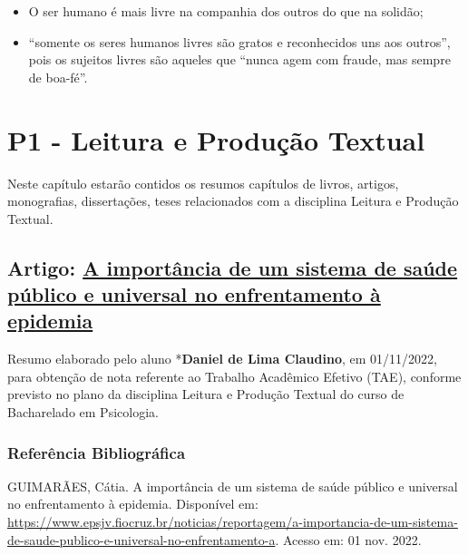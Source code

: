 \documentclass[
]{book}
\providecommand{\tightlist}{%
  \setlength{\itemsep}{0pt}\setlength{\parskip}{0pt}}
\begin{document}
\begin{itemize}
  \begin{itemize}
  \tightlist
  \item
    O ser humano é mais livre na companhia dos outros do que na solidão;
  \item
    ``somente os seres humanos livres são gratos e reconhecidos uns aos outros'', pois os sujeitos livres são aqueles que ``nunca agem com fraude, mas sempre de boa-fé''.
  \end{itemize}
\end{itemize}

\hypertarget{p1---leitura-e-produuxe7uxe3o-textual}{%
\chapter{P1 - Leitura e Produção Textual}\label{p1---leitura-e-produuxe7uxe3o-textual}}

Neste capítulo estarão contidos os resumos capítulos de livros, artigos, monografias, dissertações, teses relacionados com a disciplina Leitura e Produção Textual.

\hypertarget{artigo-a-importuxe2ncia-de-um-sistema-de-sauxfade-puxfablico-e-universal-no-enfrentamento-uxe0-epidemia}{%
\section{\texorpdfstring{Artigo: \href{https://www.epsjv.fiocruz.br/noticias/reportagem/a-importancia-de-um-sistema-de-saude-publico-e-universal-no-enfrentamento-a}{A importância de um sistema de saúde público e universal no enfrentamento à epidemia}}{Artigo: A importância de um sistema de saúde público e universal no enfrentamento à epidemia}}\label{artigo-a-importuxe2ncia-de-um-sistema-de-sauxfade-puxfablico-e-universal-no-enfrentamento-uxe0-epidemia}}

Resumo elaborado pelo aluno *\textbf{Daniel de Lima Claudino}, em 01/11/2022, para obtenção de nota referente ao Trabalho Acadêmico Efetivo (TAE), conforme previsto no plano da disciplina Leitura e Produção Textual do curso de Bacharelado em Psicologia.

\hypertarget{referuxeancia-bibliogruxe1fica}{%
\subsection{Referência Bibliográfica}\label{referuxeancia-bibliogruxe1fica}}

GUIMARÃES, Cátia. A importância de um sistema de saúde público e universal no enfrentamento à epidemia. Disponível em: \url{https://www.epsjv.fiocruz.br/noticias/reportagem/a-importancia-de-um-sistema-de-saude-publico-e-universal-no-enfrentamento-a}. Acesso em: 01 nov. 2022.
\end{document}
